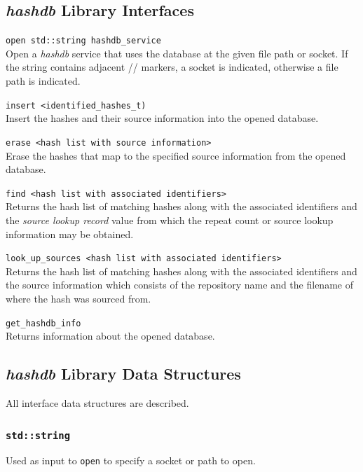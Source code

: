 \documentclass[12pt,twoside]{article}
\newcommand{\hdb}{\emph{hashdb}\xspace}
\begin{document}
\subsection{\hdb Library Interfaces}
\begin{compactitem}
\item \texttt{open std::string hashdb\_service} \\
Open a \hdb service that uses the database at the given file path or socket.
If the string contains adjacent // markers, a socket is indicated,
otherwise a file path is indicated.
\item \texttt{insert <identified\_hashes\_t)} \\
Insert the hashes and their source information into the opened database.
\item \texttt{erase <hash list with source information>} \\
Erase the hashes that map to the specified source information
from the opened database.
\item \texttt{find <hash list with associated identifiers>} \\
Returns the hash list of matching hashes along with the associated identifiers
and the \emph{source lookup record} value from which the repeat count
or source lookup information may be obtained.
\item \texttt{look\_up\_sources <hash list with associated identifiers>} \\
Returns the hash list of matching hashes along with the associated identifiers
and the source information
which consists of the repository name and the filename
of where the hash was sourced from.
\item \texttt{get\_hashdb\_info} \\
Returns information about the opened database.
\end{compactitem}

\subsection {\hdb Library Data Structures}
All interface data structures are described.

\subsubsection{\texttt{std::string}}
\begin{compactitem}
\item Used as input to \texttt{open} to specify a socket or path to open.
\end{compactitem}
\end{document}
